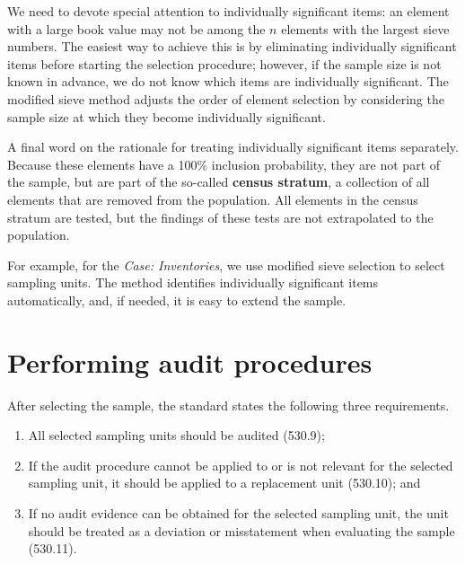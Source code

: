 We need to devote special attention to individually significant items: an element with a large book value may not be among the $n$ elements with the largest sieve numbers. The easiest way to achieve this is by eliminating individually significant items before starting the selection procedure; however, if the sample size is not known in advance, we do not know which items are individually significant. The modified sieve method adjusts the order of element selection by considering the sample size at which they become individually significant.

\newpage
A final word on the rationale for treating individually significant items separately. Because these elements have a 100\% inclusion pro\-ba\-bi\-lity, they are not part of the sample, but are part of the so-called \textbf{census stratum}, a collection of all elements that are removed from the population. All elements in the census stratum are tested, but the findings of these tests are not extrapolated to the population.

For example, for the \emph{Case: Inventories}, we use modified sieve selection to select sampling units. The method identifies individually significant items automatically, and, if needed, it is easy to extend the sample.



\section{Performing audit procedures} %
\label{sec:performing_audit_procedures}

After selecting the sample, the standard states the following three requirements.

\begin{enumerate}
\item All selected sampling units should be audited (530.9);
\item If the audit procedure cannot be applied to or is not relevant for the selected sampling unit, it should be applied to a replacement unit (530.10); and
\item If no audit evidence can be obtained for the selected sampling unit, the unit should be treated as a deviation or misstatement when evaluating the sample (530.11).
\end{enumerate}

